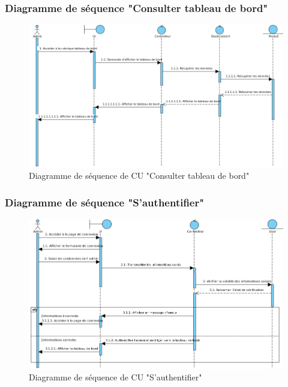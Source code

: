 \subsubsection{Diagramme de séquence "Consulter tableau de bord"}
\begin{figure}[H]
	\centering
	\includegraphics[width=1\textwidth]{logos/consultertb.png}
	\caption{Diagramme de séquence de CU "Consulter tableau de bord"}
	\label{fig:seqconsultertb}
\end{figure}

\subsubsection{Diagramme de séquence "S'authentifier"}
\begin{figure}[H]
	\centering
	\includegraphics[width=1\textwidth]{logos/sauthentifier.png}
	\caption{Diagramme de séquence de CU "S'authentifier"}
	\label{fig:sauthentifier}
\end{figure}

